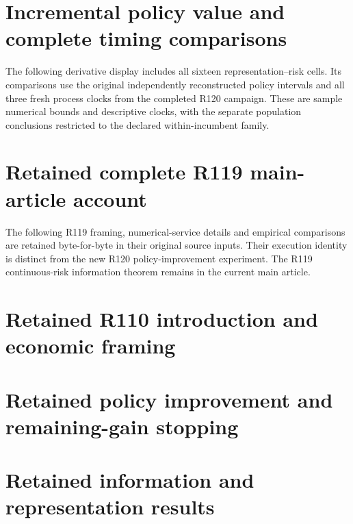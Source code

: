 \documentclass[ecta,nameyear,draft]{econsocart}
\begin{document}

\section{Incremental policy value and complete timing comparisons}
\label{dev:incrementalcomparison120}
The following derivative display includes all sixteen representation--risk
cells. Its comparisons use the original independently reconstructed policy
intervals and all three fresh process clocks from the completed R120 campaign.
These are sample numerical bounds and descriptive clocks, with the separate
population conclusions restricted to the declared within-incumbent family.

\section{Retained complete R119 main-article account}\label{dev:main119}
The following R119 framing, numerical-service details and empirical comparisons
are retained byte-for-byte in their original source inputs. Their execution
identity is distinct from the new R120 policy-improvement experiment. The R119
continuous-risk information theorem remains in the current main article.


















\section{Retained R110 introduction and economic framing}\label{dev:intro110}

\section{Retained policy improvement and remaining-gain stopping}


\section{Retained information and representation results}



\end{document}
